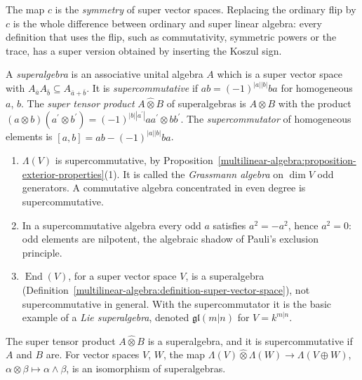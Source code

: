 The map $c$ is the \emph{symmetry} of super vector spaces. Replacing the ordinary flip by $c$ is the whole difference between ordinary and super linear algebra: every definition that uses the flip,
such as commutativity, symmetric powers or the trace, has a super version obtained by inserting the Koszul sign.

\begin{definition}\label{multilinear-algebra:definition-superalgebra}
A \emph{superalgebra} is an associative unital algebra $A$ which is a super vector space with $A_{\bar a}A_{\bar b} \subseteq A_{\bar a + \bar b}$. It is \emph{supercommutative} if $ab = (-1)^{|a||b|}ba$ for homogeneous $a$, $b$.
The \emph{super tensor product} $A \hat\otimes B$ of superalgebras is $A \otimes B$ with the product $(a \otimes b)(a^{\prime} \otimes b^{\prime}) = (-1)^{|b||a^{\prime}|}aa^{\prime} \otimes bb^{\prime}$. The
\emph{supercommutator} of homogeneous elements is $[a, b] = ab - (-1)^{|a||b|}ba$.
\end{definition}

\begin{example}\label{multilinear-algebra:example-superalgebras}
\begin{enumerate}
\item $\Lambda(V)$ is supercommutative, by Proposition~\ref{multilinear-algebra:proposition-exterior-properties}(1). It is called the \emph{Grassmann algebra} on $\dim V$ odd generators. A commutative algebra
concentrated in even degree is supercommutative.
\item In a supercommutative algebra every odd $a$ satisfies $a^2 = -a^2$, hence $a^2 = 0$: odd elements are nilpotent, the algebraic shadow of Pauli's exclusion principle.
\item $\operatorname{End}(V)$, for a super vector space $V$, is a superalgebra (Definition~\ref{multilinear-algebra:definition-super-vector-space}), not supercommutative in general. With the supercommutator it is the
basic example of a \emph{Lie superalgebra}, denoted $\mathfrak{gl}(m|n)$ for $V = k^{m|n}$.
\end{enumerate}
\end{example}

\begin{proposition}\label{multilinear-algebra:proposition-super-tensor-algebra}
The super tensor product $A \hat\otimes B$ is a superalgebra, and it is supercommutative if $A$ and $B$ are. For vector spaces $V$, $W$, the map $\Lambda(V) \hat\otimes \Lambda(W) \to \Lambda(V \oplus W)$,
$\alpha \otimes \beta \mapsto \alpha \wedge \beta$, is an isomorphism of superalgebras.
\end{proposition}

